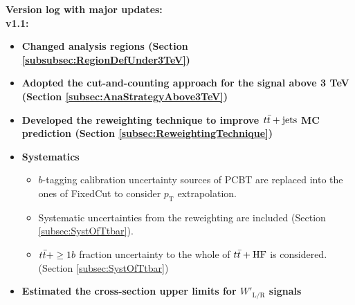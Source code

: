 \textbf{Version log with major updates:}\\
\textbf{\color{blue}v1.1:}

\begin{itemize}
    \item \textbf{Changed analysis regions (Section \ref{subsubsec:RegionDefUnder3TeV})}
    \item \textbf{Adopted the cut-and-counting approach for the signal above 3 TeV (Section \ref{subsec:AnaStrategyAbove3TeV})}
    \item \textbf{Developed the reweighting technique to improve $t\Bar{t}+\text{jets}$ MC prediction (Section \ref{subsec:ReweightingTechnique})}
    \item \textbf{Systematics}
    \begin{itemize}
        \item $b$-tagging calibration uncertainty sources of PCBT are replaced into the ones of FixedCut to consider $p_{\text{T}}$ extrapolation.
        \item Systematic uncertainties from the reweighting are included (Section \ref{subsec:SystOfTtbar}).
        \item $t\Bar{t}+\geq1b$ fraction uncertainty to the whole of $t\Bar{t}+\text{HF}$ is considered. (Section \ref{subsec:SystOfTtbar})
    \end{itemize}
    \item \textbf{Estimated the cross-section upper limits for $W'_{\text{L/R}}$ signals} 
\end{itemize}
